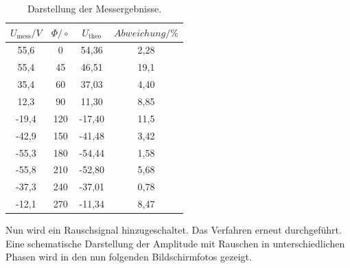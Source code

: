 \begin{table}[H]
\centering
\caption{Darstellung der Messergebnisse.}
\label{tab:1}
 \begin{tabular}{c c c c}
  \toprule
     $U_\text{mess} / V$ & $\Phi/\circ$ & $U_\text{theo}$ & $Abweichung / \%$ \\
  \midrule
  55,6  & 0    & 54,36 & 2,28\\
  55,4  & 45   & 46,51 & 19,1\\
  35,4  & 60   & 37,03 & 4,40\\
  12,3  & 90   & 11,30 & 8,85\\
  -19,4 & 120  &-17,40 & 11,5\\
  -42,9 & 150  &-41,48 & 3,42\\
  -55,3 & 180  &-54,44 & 1,58\\
  -55,8 & 210  &-52,80 & 5,68\\
  -37,3 & 240  &-37,01 & 0,78\\
  -12,1 & 270  &-11,34 & 8,47\\
  \bottomrule
\end{tabular}
\end{table}

Nun wird ein Rauschsignal hinzugeschaltet. Das Verfahren erneut durchgeführt.
Eine schematische Darstellung der Amplitude mit Rauschen in unterschiedlichen Phasen wird in den nun folgenden
Bildschirmfotos gezeigt.

